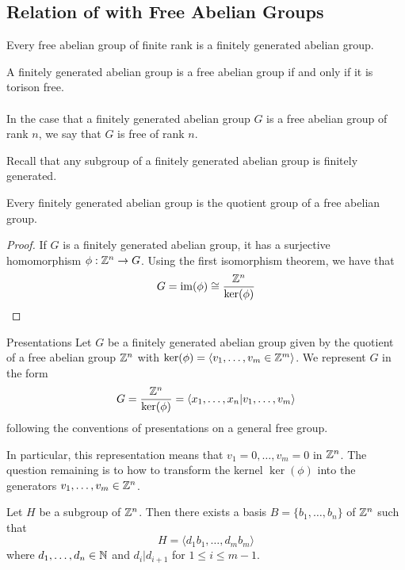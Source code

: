 \documentclass[a4paper]{article}
\begin{document}
\subsection{Relation of with Free Abelian Groups}
\begin{lmm}{}{} Every free abelian group of finite rank is a finitely generated abelian group. 
\end{lmm}

\begin{thm}{}{} A finitely generated abelian group is a free abelian group if and only if it is torison free. \\~\\
In the case that a finitely generated abelian group $G$ is a free abelian group of rank $n$, we say that $G$ is free of rank $n$. 
\end{thm}

Recall that any subgroup of a finitely generated abelian group is finitely generated. 

\begin{thm}{}{} Every finitely generated abelian group is the quotient group of a free abelian group. \tcbline
\begin{proof}
If $G$ is a finitely generated abelian group, it has a surjective homomorphism $\phi:\mathbb{Z}^n\to G$. Using the first isomorphism theorem, we have that $$G=\operatorname{im}(\phi)\cong\frac{\mathbb{Z}^n}{\ker(\phi)}$$
\end{proof}
\end{thm}

\begin{defn}{Presentations}{} Let $G$ be a finitely generated abelian group given by the quotient of a free abelian group $\mathbb{Z}^n$ with $\ker(\phi)=\langle v_1,\dots,v_m\in\mathbb{Z}^m\rangle$. We represent $G$ in the form $$G=\frac{\mathbb{Z}^n}{\ker(\phi)}=\langle x_1,\dots,x_n|v_1,\dots,v_m\rangle$$ following the conventions of presentations on a general free group. 
\end{defn}

In particular, this representation means that $v_1=0,\dots,v_m=0$ in $\mathbb{Z}^n$. The question remaining is to how to transform the kernel $\ker(\phi)$ into the generators $v_1,\dots,v_m\in\mathbb{Z}^n$. 

\begin{prp}{}{} Let $H$ be a subgroup of $\mathbb{Z}^n$. Then there exists a basis $B=\{b_1,\dots,b_n\}$ of $\mathbb{Z}^n$ such that $$H=\langle d_1b_1,\dots,d_mb_m\rangle$$ where $d_1,\dots,d_n\in\mathbb{N}$ and $d_i|d_{i+1}$ for $1\leq i\leq m-1$. 
\end{prp}
\end{document}
